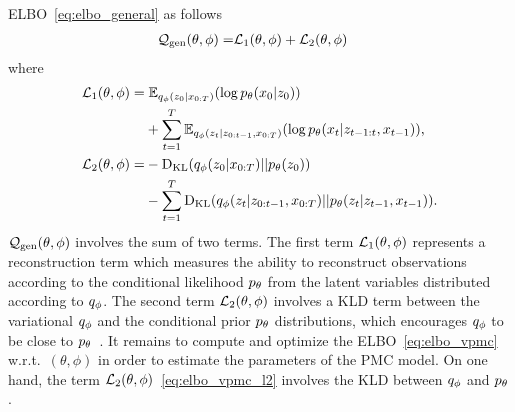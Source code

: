 ELBO~\eqref{eq:elbo_general} as follows
\begin{align}
    \label{eq:elbo_vpmc}
    \mathcal{Q}_{\mathrm{gen}}(\theta,\phi) =& \mathcal{L}_1(\theta,\phi) +  \mathcal{L}_2(\theta,\phi)
\end{align}
where
\begin{align}
    \mathcal{L}_1(\theta,\phi) =& \; {\mathbb{E}}_{q_\phi(z_0| x_{0:T} )} (  \log p_{\theta}(x_0| z_0)) 
    \nonumber
    \\
    \label{eq:elbo_vpmc_l1}
    &+  
    \sum_{t=1}^T {\mathbb{E}}_{q_\phi(z_t|z_{0:t-1},x_{0:T})}
    (  \log p_{\theta}(x_t|z_{t-1:t},x_{t-1} ) )\text{,}\\
    \mathcal{L}_2(\theta,\phi) =& - \mathrm{D}_{\mathrm{KL}}(q_\phi(z_0| x_{0:T} ) | |  p_{\theta}(z_0))
    \nonumber
    \\
    \label{eq:elbo_vpmc_l2}
    & - \sum_{t=1}^T  \mathrm{D}_{\mathrm{KL}}(q_\phi(z_t|z_{0:t-1},x_{0:T}) | | p_{\theta}(z_t|z_{t-1},x_{t-1})) \text{.}
\end{align}
$\mathcal{Q}_{\mathrm{gen}}(\theta,\phi)$ involves the sum of two terms. The first term $\mathcal{L}_1(\theta,\phi)$ represents
a reconstruction term which measures the ability to reconstruct observations
according to the conditional likelihood $p_{\theta}$ from the latent variables
distributed according to $q_\phi$.
The second term $\mathcal{L}_2(\theta,\phi)$ involves a KLD term between 
the variational  $q_\phi$ and the conditional prior $p_{\theta}$ distributions,
which encourages $q_\phi$ to be close to $p_{\theta}$~\citep{kingma2014}.
It remains to compute and optimize the 
ELBO~\eqref{eq:elbo_vpmc} w.r.t.~$(\theta,\phi)$ 
in order to estimate the parameters of the PMC model.
On one hand, the term $\mathcal{L}_2(\theta,\phi)$~\eqref{eq:elbo_vpmc_l2} 
involves the KLD between
$q_\phi$ and $p_{\theta}$.






